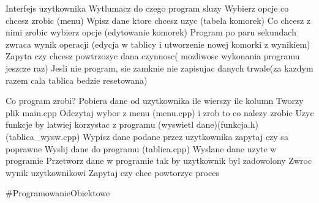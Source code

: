 Interfejs uzytkownika Wytlumacz do czego program sluzy Wybierz opcje co chcesz zrobic (menu) Wpisz dane ktore chcesz uzyc (tabela komorek) Co chcesz z nimi zrobic wybierz opcje (edytowanie komorek) Program po paru sekundach zwraca wynik operacji (edycja w tablicy i utworzenie nowej komorki z wynikiem) Zapyta czy chcesz powtrzozyc dana czynnosc( mozliwosc wykonania programu jeszcze raz) Jesli nie program, sie zamknie nie zapisujac danych trwale(za kazdym razem cala tablica bedzie resetowana)

Co program zrobi? Pobiera dane od uzytkownika ile wierszy ile kolumn Tworzy plik main.\+cpp Odczytaj wybor z menu (menu.\+cpp) i zrob to co nalezy zrobic Uzyc funkcje by latwiej korzystac z programu (wyswietl dane)(funkcja.\+h)(tablica\+\_\+wysw.\+cpp) Wypisz dane podane przez uzytkownika zapytaj czy sa poprawne Wyslij dane do programu (tablica.\+cpp) Wyslane dane uzyte w programie Przetworz dane w programie tak by uzytkownik byl zadowolony Zwroc wynik uzytkownikowi Zapytaj czy chce powtorzyc proces

\#\+Programowanie\+Obiektowe 